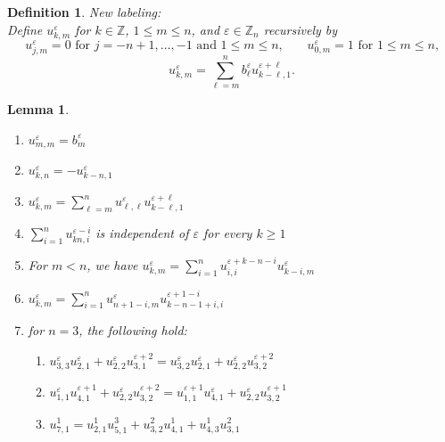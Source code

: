 \documentclass{amsart}
\newtheorem{definition}[theorem]{Definition}
\newtheorem{lemma}[theorem]{Lemma}
\numberwithin{theorem}{section}
\newcommand{\ZZ}{\mathbb{Z}}
\begin{document}
  \begin{definition}
    New labeling:\\
    Define $u_{k,m}^\varepsilon$ for $k\in\ZZ$, $1\le m\le n$, and $\varepsilon\in\ZZ_n$ recursively by
    \[u_{j,m}^\varepsilon = 0 \text{ for $j=-n+1,\ldots,-1$ and $1\le m\le n$,} \qquad u_{0,m}^\varepsilon = 1 \text{ for $1\le m\le n$,}\]
    \[u_{k,m}^\varepsilon = \sum\limits_{\ell=m}^n b_\ell^\varepsilon u_{k-\ell,1}^{\varepsilon+\ell}.\]
  \end{definition}
  \begin{lemma}
    \mbox{}
    \begin{enumerate}
      \item $u_{m,m}^\varepsilon = b_m^\varepsilon$
      \item $u_{k,n}^\varepsilon = -u_{k-n,1}^\varepsilon$
      \item $u_{k,m}^\varepsilon = \sum\limits_{\ell=m}^n u_{\ell,\ell}^\varepsilon u_{k-\ell,1}^{\varepsilon+\ell}$
      \item $\sum\limits_{i=1}^{n} u_{kn,i}^{\varepsilon-i}$ is independent of $\varepsilon$ for every $k\ge1$
      \item For $m<n$, we have $u_{k,m}^\varepsilon = \sum\limits_{i=1}^n u_{i,i}^{\varepsilon+k-n-i} u_{k-i,m}^\varepsilon$
      \item $u_{k,m}^\varepsilon = \sum\limits_{i=1}^n u_{n+1-i,m}^{\varepsilon} u_{k-n-1+i,i}^{\varepsilon+1-i}$
      \item for $n=3$, the following hold:
        \begin{enumerate}
          \item $u_{3,3}^\varepsilon u_{2,1}^\varepsilon + u_{2,2}^\varepsilon u_{3,1}^{\varepsilon+2} = u_{3,2}^\varepsilon u_{2,1}^\varepsilon + u_{2,2}^\varepsilon u_{3,2}^{\varepsilon+2}$
          \item $u_{1,1}^\varepsilon u_{4,1}^{\varepsilon+1} + u_{2,2}^\varepsilon u_{3,2}^{\varepsilon+2} = u_{1,1}^{\varepsilon+1} u_{4,1}^\varepsilon + u_{2,2}^\varepsilon u_{3,2}^{\varepsilon+1}$
          \item $u_{7,1}^1 = u_{2,1}^1 u_{5,1}^3 + u_{3,2}^2 u_{4,1}^1 + u_{4,3}^1 u_{3,1}^2$
        \end{enumerate}
    \end{enumerate}
  \end{lemma}
\end{document}
